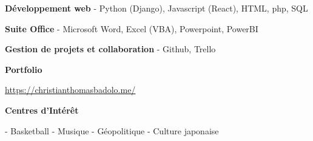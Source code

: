 \documentclass[11pt]{article}
\newcommand{\subsectiontitle}[1]{\noindent\textbf{#1}}
\newcommand{\website}[1]{\href{#1}{#1}}
\begin{document}
\begin{multicols}{2}
\textbf{Développement web}
- Python (Django), Javascript (React), HTML, php, SQL

\textbf{Suite Office}
- Microsoft Word, Excel (VBA), Powerpoint, PowerBI

\textbf{Gestion de projets et collaboration}
- Github, Trello

\subsectiontitle{Portfolio}

\website{https://christianthomasbadolo.me/}

\subsectiontitle{Centres d'Intérêt}

- Basketball
- Musique
- Géopolitique
- Culture japonaise

\end{multicols}
\end{document}
